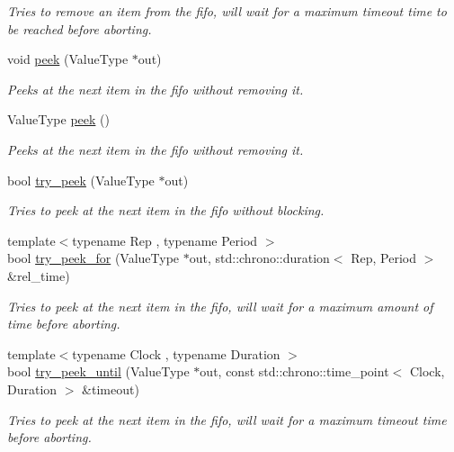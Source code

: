 \begin{DoxyCompactItemize}
\begin{DoxyCompactList}\small\item\em Tries to remove an item from the fifo, will wait for a maximum timeout time to be reached before aborting. \end{DoxyCompactList}\item 
void \hyperlink{classcpen333_1_1thread_1_1fifo_a92290d2ef599d0e05f5a869f71bef2db}{peek} (Value\+Type $\ast$out)
\begin{DoxyCompactList}\small\item\em Peeks at the next item in the fifo without removing it. \end{DoxyCompactList}\item 
Value\+Type \hyperlink{classcpen333_1_1thread_1_1fifo_a92cb2efc91d788736f6ea8741b1cf4a5}{peek} ()
\begin{DoxyCompactList}\small\item\em Peeks at the next item in the fifo without removing it. \end{DoxyCompactList}\item 
bool \hyperlink{classcpen333_1_1thread_1_1fifo_a0a87d4e6696311526278db72bbfc91c1}{try\+\_\+peek} (Value\+Type $\ast$out)
\begin{DoxyCompactList}\small\item\em Tries to peek at the next item in the fifo without blocking. \end{DoxyCompactList}\item 
{\footnotesize template$<$typename Rep , typename Period $>$ }\\bool \hyperlink{classcpen333_1_1thread_1_1fifo_a1e8fefca92a17bf1662b1747690ecc5d}{try\+\_\+peek\+\_\+for} (Value\+Type $\ast$out, std\+::chrono\+::duration$<$ Rep, Period $>$ \&rel\+\_\+time)
\begin{DoxyCompactList}\small\item\em Tries to peek at the next item in the fifo, will wait for a maximum amount of time before aborting. \end{DoxyCompactList}\item 
{\footnotesize template$<$typename Clock , typename Duration $>$ }\\bool \hyperlink{classcpen333_1_1thread_1_1fifo_a509aacf149e0a000ec3e8876ce2d2d93}{try\+\_\+peek\+\_\+until} (Value\+Type $\ast$out, const std\+::chrono\+::time\+\_\+point$<$ Clock, Duration $>$ \&timeout)
\begin{DoxyCompactList}\small\item\em Tries to peek at the next item in the fifo, will wait for a maximum timeout time before aborting. \end{DoxyCompactList}\item 

\end{DoxyCompactItemize}
